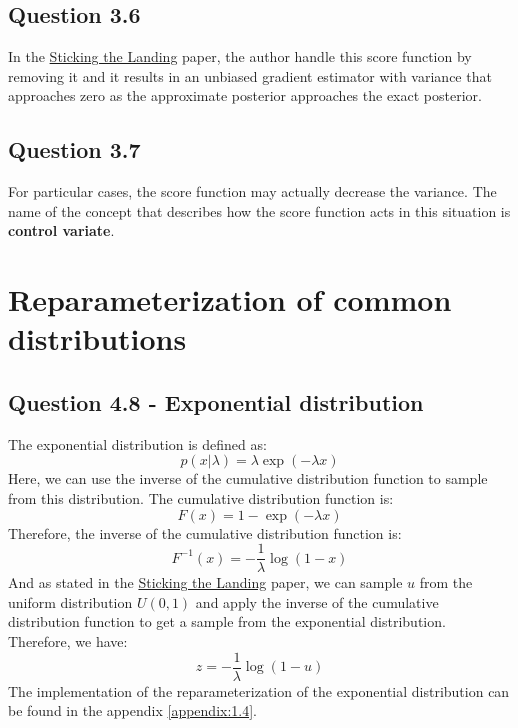 \documentclass{article}
\begin{document}
\subsection{Question 3.6}
In the \href{https://arxiv.org/abs/1703.09194}{Sticking the Landing} paper, the author handle this score function by removing it and it results in an unbiased gradient estimator with variance that approaches zero as the approximate posterior approaches the exact posterior.

\subsection{Question 3.7}
For particular cases, the score function may actually decrease the variance. The name of the concept that describes how the score function acts in this situation is \textbf{control variate}.

\section{Reparameterization of common distributions}
\subsection{Question 4.8 - Exponential distribution}
The exponential distribution is defined as:
\begin{equation}
  p(x|\lambda) = \lambda \exp(-\lambda x)
\end{equation}
Here, we can use the inverse of the cumulative distribution function to sample from this distribution. The cumulative distribution function is:
\begin{equation}
  F(x) = 1 - \exp(-\lambda x)
\end{equation}
Therefore, the inverse of the cumulative distribution function is:
\begin{equation}
  F^{-1}(x) = -\frac{1}{\lambda} \log(1 - x)
\end{equation}
And as stated in the \href{https://arxiv.org/abs/1703.09194}{Sticking the Landing} paper, we can sample $u$ from the uniform distribution $U(0,1)$ and apply the inverse of the cumulative distribution function to get a sample from the exponential distribution. Therefore, we have:
\begin{equation}
  z = -\frac{1}{\lambda} \log(1 - u)
\end{equation}
The implementation of the reparameterization of the exponential distribution can be found in the appendix \ref{appendix:1.4}.
\end{document}
